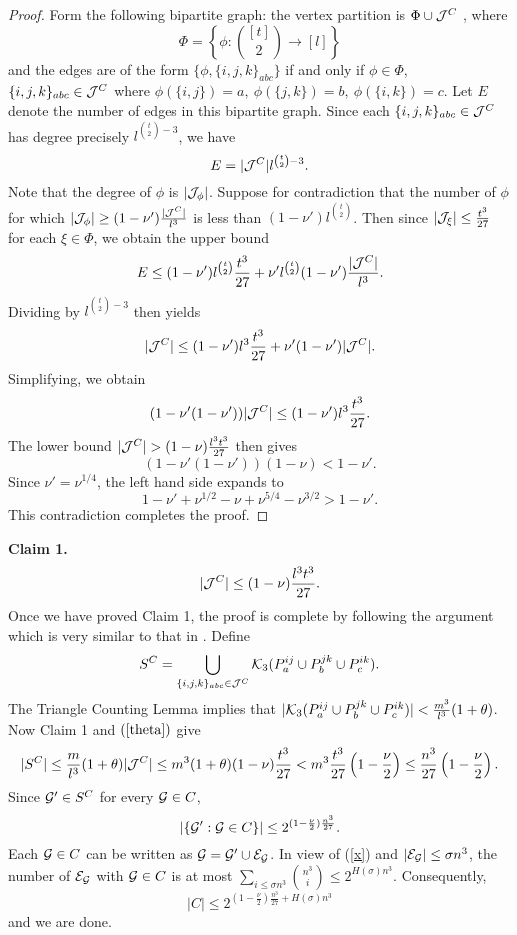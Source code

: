 \documentclass[11pt]{article}
\begin{document}
\begin{proof}   Form the following bipartite graph: the vertex partition is
$\Phi \cup {\cal J}^C$ , where
$$\Phi=\left\{\phi: {[t]\choose 2} \rightarrow [l]\right\}$$
and the edges are of the form $\{\phi, \{i,j,k\}_{abc}\}$ if and only if $\phi \in \Phi$,
 $\{i,j,k\}_{abc}\in {\cal J}^C$ where $\phi(\{i,j\})=a,\  \phi(\{j,k\})=b,\  \phi(\{i,k\})=c$.
 Let $E$ denote the number of edges in this bipartite graph. Since each $\{i,j,k\}_{abc} \in {\cal J}^C$ has degree precisely
$l^{{t \choose 2}-3}$, we have
$$E=|{\cal J}^C| l^{{t \choose 2}-3}.$$
Note that the degree of $\phi$ is $|{\cal J}_{\phi}|$.
 Suppose for contradiction that the number of $\phi$ for which
 $|{\cal J}_{\phi}| \ge (1-\nu')\frac{|{\cal J}^C|}{l^3}$ is less than $(1-\nu') l^{{t \choose 2}}$.
 Then since $|{\cal J}_{\xi}|\le \frac{t^3}{27}$ for each $\xi\in \Phi$,  we obtain the upper bound
$$E\le (1-\nu') l^{{t \choose 2}}\frac{t^3}{27} + \nu'l^{{t \choose 2}}(1-\nu')\frac{|{\cal J}^C|}{l^3}.$$
Dividing by $l^{{t \choose 2}-3}$ then yields
$$|{\cal J}^C| \le (1-\nu')l^3\frac{t^3}{27} + \nu'(1-\nu')|{\cal J}^C|.$$
Simplifying, we obtain
$$(1-\nu'(1-\nu'))|{\cal J}^C|\le (1-\nu')l^3\frac{t^3}{27}.$$
  The lower bound $|\cJ^C|>(1-\nu)\frac{l^3t^3}{27}$ then gives
$$(1-\nu'(1-\nu'))(1-\nu)< 1-\nu'.$$
Since $\nu'=\nu^{1/4}$, the left hand side expands to
$$1-\nu'+\nu^{1/2}-\nu+\nu^{5/4}-\nu^{3/2}>1-\nu'.$$
This contradiction completes the proof.\end{proof}

{\bf Claim 1.}
$$|{\cal J}^C|\le (1-\nu)\frac{l^3 t^3}{27}.$$
Once we have proved Claim 1, the proof is complete by following the argument which is very
similar to that in \cite{NR}. Define
$$S^C=\bigcup_{ \{i,j,k\}_{abc} \in {\cal J}^C} {\cal K}_3(P_a^{ij} \cup P_b^{jk} \cup P_c^{ik}).$$
The Triangle Counting Lemma implies that $|{\cal K}_3(P_a^{ij} \cup P_b^{jk} \cup P_c^{ik})| <\frac{m^3}{l^3}(1+\theta)$.
 Now  Claim 1 and $(\ref{theta})$  give
$$|S^C| \le \frac{m}{l^3}(1+\theta)|{\cal J}^C|\le m^3(1+\theta)(1-\nu)\frac{t^3}{27}<m^3\frac{t^3}{27}
\left(1-\frac{\nu}{2}\right)\le \frac{n^3}{27}\left(1-\frac{\nu}{2}\right).$$
Since ${{\cal G}}' \in S^C$ for every ${{\cal G}} \in C$,
$$|\{{{\cal G}}': {{\cal G}} \in C\}|\le 2^{(1-\frac{\nu}{2})\frac{n^3}{27}}.$$
Each ${{\cal G}} \in C$ can be written as ${{\cal G}}={{\cal G}}' \cup {\cal E}_{{{\cal G}}}$. In view of (\ref{x}) and
$|{\cal E}_{{{\cal G}}}|\le \sigma n^3$, the number of ${\cal E}_{{{\cal G}}}$ with ${{\cal G}} \in
C$ is at most $\sum_{i\le \sigma n^3} {n^3 \choose i}\le
2^{H(\sigma)n^3}$.
 Consequently,
$$|C| \le 2^{(1-\frac{\nu}{2})\frac{n^3}{27}+H(\sigma)n^3}
$$
and we are done.
\end{document}
